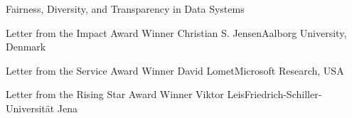 \documentclass[11pt]{article}
\begin{document}
\begin{bulletin}
\begin{articlesection}{Fairness, Diversity, and Transparency in Data Systems}
\end{articlesection}




%
%



\begin{awardsection}
\begin{award}{Letter from the Impact Award Winner}
{Christian S. Jensen}{Aalborg University, Denmark}

\end{award}
\newpage
\begin{award}{Letter from the Service Award Winner}
{David Lomet}{Microsoft Research, USA}

\end{award}
\newpage
\begin{award}{Letter from the Rising Star Award Winner}
{Viktor Leis}{Friedrich-Schiller-Universität Jena}

\end{award}
\end{awardsection}



\begin{callsection}


\end{callsection}
\end{bulletin}
\end{document}

